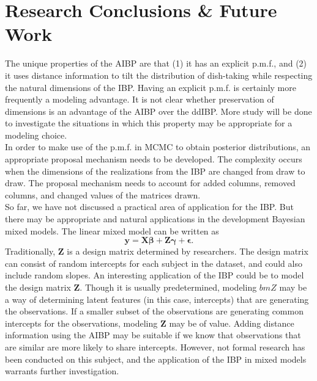 \chapter{Research Conclusions \& Future Work}
The unique properties of the AIBP are that (1) it has an explicit p.m.f., and
(2) it uses distance information to tilt the distribution of dish-taking
while respecting the natural dimensions of the IBP. Having an explicit p.m.f.
is certainly more frequently a modeling advantage. It is not clear whether 
preservation of dimensions is an advantage of the AIBP over the ddIBP. More study
will be done to investigate the situations in which this property may be 
appropriate for a modeling choice.\\

\noindent
In order to make use of the p.m.f. in MCMC to obtain posterior distributions, an
appropriate proposal mechanism needs to be developed. The complexity occurs when
the dimensions of the realizations from the IBP are changed from draw to draw. 
The proposal mechanism needs to account for added columns, removed columns, and 
changed values of the matrices drawn. \\

\noindent
So far, we have not discussed a practical area of application for the IBP.
But there may be appropriate and natural applications in the development Bayesian
mixed models. The linear mixed model can be written as
\[
  \bm{y = X\beta + Z\gamma + \epsilon}.
\]
Traditionally, $\bm Z$ is a design matrix determined by researchers. The design 
matrix can consist of random intercepts for each subject in the dataset, and could
also include random slopes. An interesting application of the IBP could be 
to model the design matrix $\bm Z$. Though it is usually predetermined, modeling 
$bm Z$ may be a way of determining latent features (in this case, intercepts) that 
are generating the observations. If a smaller subset of the observations are
generating common intercepts for the observations, modeling $\bm Z$ may be of 
value. Adding distance information using the AIBP may be suitable if we know
that observations that are similar are more likely to share intercepts. However, 
not formal research has been conducted on this subject, and the application of 
the IBP in mixed models warrants further investigation.
